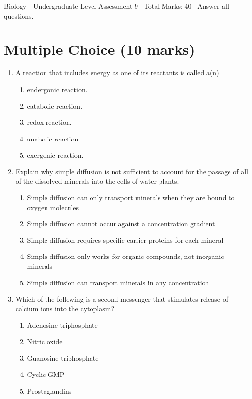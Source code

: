 \documentclass[12pt]{article}
\begin{document}
\begin{center}
Biology - Undergraduate Level Assessment 9 \
Total Marks: 40 \
Answer all questions.
\end{center}

\section*{Multiple Choice (10 marks)}
\begin{enumerate}[label=\arabic*.]
\item A reaction that includes energy as one of its reactants is called a(n)
\begin{enumerate}[label=(\alph*)]
    \item endergonic reaction.
    \item catabolic reaction.
    \item redox reaction.
    \item anabolic reaction.
    \item exergonic reaction.
\end{enumerate}
\item Explain why simple diffusion is not sufficient to account for the passage of all of the dissolved minerals into the cells of water plants.
\begin{enumerate}[label=(\alph*)]
    \item Simple diffusion can only transport minerals when they are bound to oxygen molecules
    \item Simple diffusion cannot occur against a concentration gradient
    \item Simple diffusion requires specific carrier proteins for each mineral
    \item Simple diffusion only works for organic compounds, not inorganic minerals
    \item Simple diffusion can transport minerals in any concentration
\end{enumerate}
\item Which of the following is a second messenger that stimulates release of calcium ions into the cytoplasm?
\begin{enumerate}[label=(\alph*)]
    \item Adenosine triphosphate
    \item Nitric oxide
    \item Guanosine triphosphate
    \item Cyclic GMP
    \item Prostaglandins
\end{enumerate}

\end{enumerate}
\end{document}
